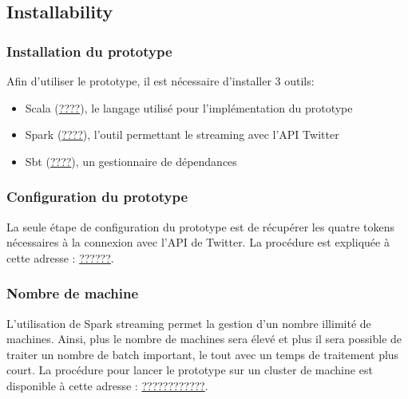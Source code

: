   \subsection{Installability}
    \subsubsection{Installation du prototype}
      Afin d'utiliser le prototype, il est nécessaire d'installer 3 outils:
      \begin{itemize}
        \item Scala (\url{????}), le langage utilisé pour l'implémentation du prototype
        \item Spark (\url{????}), l'outil permettant le streaming avec l'API Twitter
        \item Sbt (\url{????}), un gestionnaire de dépendances
      \end{itemize}

    \subsubsection{Configuration du prototype}
      La seule étape de configuration du prototype est de récupérer les quatre tokens nécessaires à la connexion avec l'API de Twitter. La procédure est expliquée à cette adresse : \url{??????}.

    \subsubsection{Nombre de machine}
      L'utilisation de Spark streaming permet la gestion d'un nombre illimité de machines. Ainsi, plus le nombre de machines sera élevé et plus il sera possible de traiter un nombre de batch important, le tout avec un temps de traitement plus court. La procédure pour lancer le prototype sur un cluster de machine est disponible à cette adresse : \url{????????????}.
